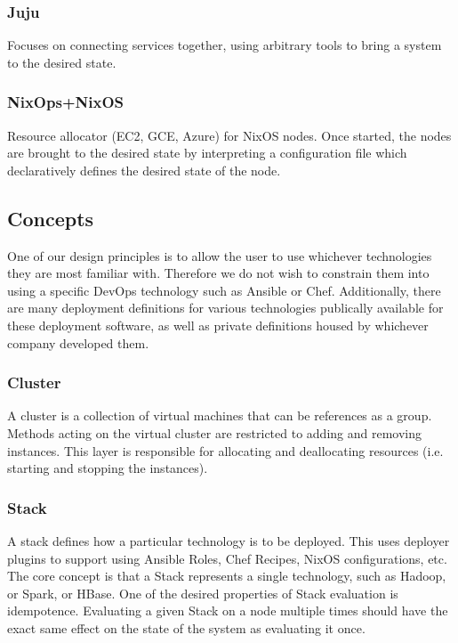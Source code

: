 \documentclass[9pt,twocolumn,twoside]{styles/osajnl}
\begin{document}
\subsubsection{Juju}

Focuses on connecting services together, using arbitrary tools to bring a system to the desired state.


\subsubsection{NixOps+NixOS}

Resource allocator (EC2, GCE, Azure) for NixOS nodes. Once started, the nodes are brought to the desired state by interpreting a configuration file which declaratively defines the desired state of the node.
\subsection{Concepts}

One of our design principles is to allow the user to use whichever technologies they are most familiar with. Therefore we do not wish to constrain them into using a specific DevOps technology such as Ansible or Chef. Additionally, there are many deployment definitions for various technologies publically available for these deployment software, as well as private definitions housed by whichever company developed them. 


\subsubsection{Cluster}

A cluster is a collection of virtual machines that can be references as a group. Methods acting on the virtual cluster are restricted to adding and removing instances. This layer is responsible for allocating and deallocating resources (i.e. starting and stopping the instances).


\subsubsection{Stack}

A stack defines how a particular technology is to be deployed. This uses deployer plugins to support using Ansible Roles, Chef Recipes, NixOS configurations, etc. The core concept is that a Stack represents a single technology, such as Hadoop, or Spark, or HBase. One of the desired properties of Stack evaluation is idempotence. Evaluating a given Stack on a node multiple times should have the exact same effect on the state of the system as evaluating it once.
\end{document}
